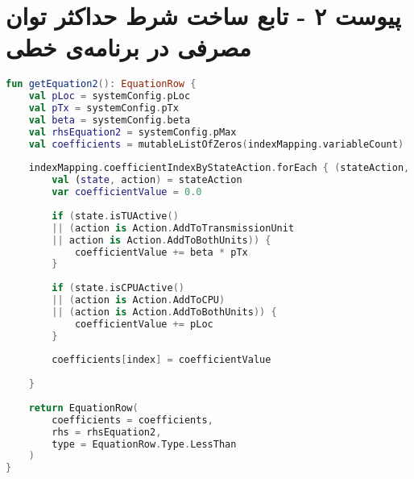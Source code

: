 \chapter*{پیوست ۲ - تابع ساخت شرط حداکثر توان مصرفی در برنامه‌ی خطی}

\begin{latin}
	\begin{lstlisting}[language=Kotlin, title=\rl{تابع ساخت شرط حداکثر توان مصرفی}]
fun getEquation2(): EquationRow {
	val pLoc = systemConfig.pLoc
	val pTx = systemConfig.pTx
	val beta = systemConfig.beta
	val rhsEquation2 = systemConfig.pMax
	val coefficients = mutableListOfZeros(indexMapping.variableCount)
	
	indexMapping.coefficientIndexByStateAction.forEach { (stateAction, index) ->
		val (state, action) = stateAction
		var coefficientValue = 0.0
		
		if (state.isTUActive() 
		|| (action is Action.AddToTransmissionUnit 
		|| action is Action.AddToBothUnits)) {
			coefficientValue += beta * pTx
		}
		
		if (state.isCPUActive() 
		|| (action is Action.AddToCPU) 
		|| (action is Action.AddToBothUnits)) {
			coefficientValue += pLoc
		}
		
		coefficients[index] = coefficientValue
		
	}
	
	return EquationRow(
		coefficients = coefficients,
		rhs = rhsEquation2,
		type = EquationRow.Type.LessThan
	)
}
\end{lstlisting}
\end{latin}
\clearpage